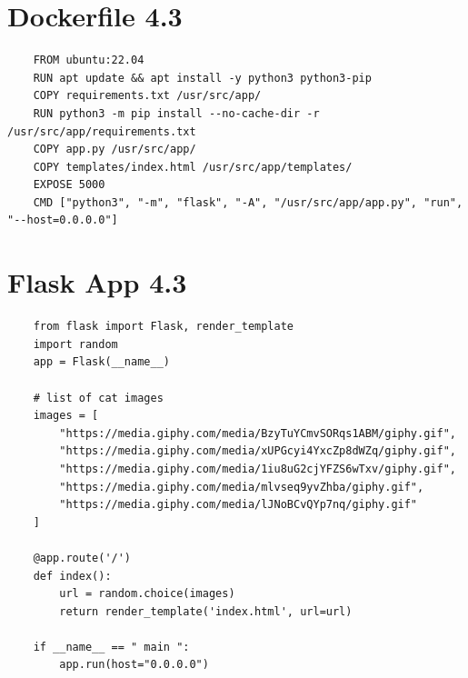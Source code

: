 \documentclass[12pt, letterpaper]{report}
\begin{document}
\newpage
\appendix 
\section{Dockerfile 4.3}
\begin{verbatim}
	FROM ubuntu:22.04
	RUN apt update && apt install -y python3 python3-pip
	COPY requirements.txt /usr/src/app/
	RUN python3 -m pip install --no-cache-dir -r /usr/src/app/requirements.txt
	COPY app.py /usr/src/app/
	COPY templates/index.html /usr/src/app/templates/
	EXPOSE 5000
	CMD ["python3", "-m", "flask", "-A", "/usr/src/app/app.py", "run", "--host=0.0.0.0"]  
\end{verbatim}

\newpage
\section{Flask App 4.3}
\begin{verbatim} 
	from flask import Flask, render_template
	import random
	app = Flask(__name__)
	
	# list of cat images
	images = [
		"https://media.giphy.com/media/BzyTuYCmvSORqs1ABM/giphy.gif",
		"https://media.giphy.com/media/xUPGcyi4YxcZp8dWZq/giphy.gif",
		"https://media.giphy.com/media/1iu8uG2cjYFZS6wTxv/giphy.gif",
		"https://media.giphy.com/media/mlvseq9yvZhba/giphy.gif",
		"https://media.giphy.com/media/lJNoBCvQYp7nq/giphy.gif"
	]
	
	@app.route('/')
	def index():
		url = random.choice(images)
		return render_template('index.html', url=url)
	
	if __name__ == " main ":
		app.run(host="0.0.0.0")
\end{verbatim}
\end{document}
